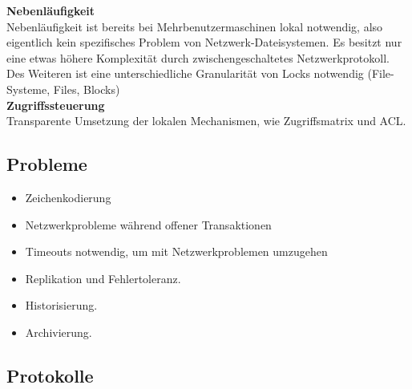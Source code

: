 \documentclass{article} %
\begin{document}
	

\noindent\textbf{Nebenläufigkeit}\\
Nebenläufigkeit ist bereits bei Mehrbenutzermaschinen lokal notwendig, also eigentlich kein spezifisches Problem von Netzwerk-Dateisystemen. Es besitzt nur eine etwas höhere Komplexität durch zwischengeschaltetes Netzwerkprotokoll. \\
Des Weiteren ist eine unterschiedliche Granularität von Locks notwendig (File-Systeme, Files, Blocks)\\



\noindent\textbf{Zugriffssteuerung}\\
Transparente Umsetzung der lokalen Mechanismen, wie Zugriffsmatrix und ACL.

\subsection{Probleme}
	\begin{itemize}
	\item Zeichenkodierung 
	\item Netzwerkprobleme während offener Transaktionen 
	\item Timeouts notwendig, um mit Netzwerkproblemen umzugehen 
	\item Replikation und Fehlertoleranz. 
	\item Historisierung. 
	\item Archivierung. 
	\end{itemize}

\subsection{Protokolle}
\end{document}

